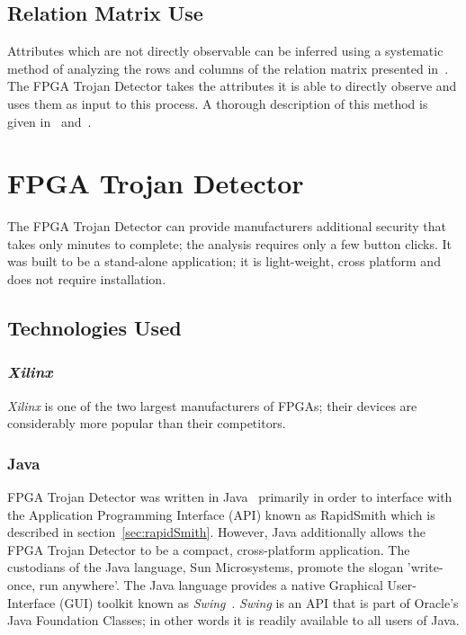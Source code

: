 \documentclass[journal, hidelinks]{IEEEtran}
\begin{document}
\subsection{Relation Matrix Use} \label{sec:matrixUse}
Attributes which are not directly observable can be inferred using a systematic method of analyzing the rows and columns of the relation matrix presented in~\cite{samerAttribute}.
The FPGA Trojan Detector takes the attributes it is able to directly observe and uses them as input to this process.
A thorough description of this method is given in~\cite{samerDissertation} and~\cite{meCategorization}.

\section{FPGA Trojan Detector} \label{sec:implementation}
The FPGA Trojan Detector can provide manufacturers additional security that takes only minutes to complete; the analysis requires only a few button clicks.
It was built to be a stand-alone application; it is light-weight, cross platform and does not require installation.
\subsection{Technologies Used}
\subsubsection{\textit{Xilinx}}
\textit{Xilinx} is one of the two largest manufacturers of FPGAs; their devices are considerably more popular than their competitors.

\subsubsection{Java} \label{sec:java}
FPGA Trojan Detector was written in Java~\cite{java} primarily in order to interface with the Application Programming Interface (API) known as RapidSmith which is described in section~\ref{sec:rapidSmith}.
However, Java additionally allows the FPGA Trojan Detector to be a compact, cross-platform application.
The custodians of the Java language, Sun Microsystems, promote the slogan 'write-once, run anywhere'. 
The Java language provides a native Graphical User-Interface (GUI) toolkit known as \textit{Swing}~\cite{swing}.
\textit{Swing} is an API that is part of Oracle's Java Foundation Classes; in other words it is readily available to all users of Java.
\end{document}
